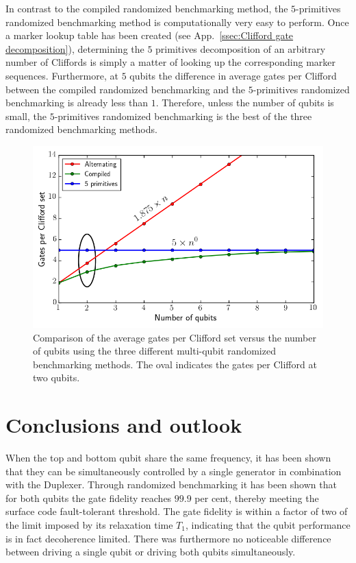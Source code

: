           In contrast to the compiled randomized benchmarking method, the $5$-primitives randomized benchmarking method is computationally very easy to perform. Once a marker lookup table has been created (see App.~\ref{ssec:Clifford gate decomposition}), determining the $5$ primitives decomposition of an arbitrary number of Cliffords is simply a matter of looking up the corresponding marker sequences. Furthermore, at $5$ qubits the difference in average gates per Clifford between the compiled randomized benchmarking and the $5$-primitives randomized benchmarking is already less than $1$. Therefore, unless the number of qubits is small, the $5$-primitives randomized benchmarking is the best of the three randomized benchmarking methods.

          \begin{figure}[h]
            \centering
            \includegraphics[width=.8\textwidth]{Figures/Randomized benchmarking/Clifford_comparison.png}
            \caption{Comparison of the average gates per Clifford set versus the number of qubits using the three different multi-qubit randomized benchmarking methods. The oval indicates the gates per Clifford at two qubits.}
            \label{fig:gate per Clifford versus qubits comparison}
          \end{figure}

  \chapter{Conclusions and outlook}

    When the top and bottom qubit share the same frequency, it has been shown that they can be simultaneously controlled by a single generator in combination with the Duplexer. Through randomized benchmarking it has been shown that for both qubits the gate fidelity reaches $99.9$ per cent, thereby meeting the surface code fault-tolerant threshold. The gate fidelity is within a factor of two of the limit imposed by its relaxation time $T_1$, indicating that the qubit performance is in fact decoherence limited. There was furthermore no noticeable difference between driving a single qubit or driving both qubits simultaneously.

